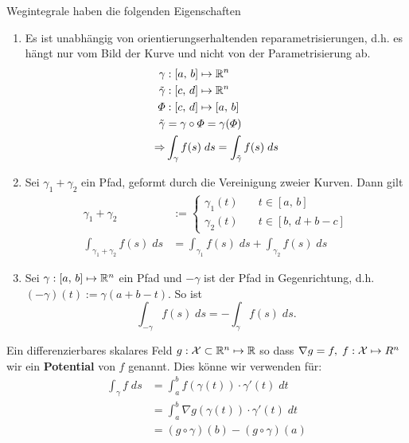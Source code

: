 Wegintegrale haben die folgenden Eigenschaften
\begin{enumerate}[label=(\arabic*)]
  \item Es ist unabhängig von orientierungserhaltenden reparametrisierungen, d.h. es hängt nur vom Bild der Kurve
  und nicht von der Parametrisierung ab.
  \begin{align*}
    \gamma&: [a,\, b] \mapsto \mathbb{R}^n\\
    \tilde{\gamma}&: [c,\, d] \mapsto \mathbb{R}^n\\
    \varPhi&: [c, \, d] \mapsto [a, \, b]\\
    \tilde{\gamma} &= \gamma \circ \varPhi = \gamma(\varPhi)\\
    \Rightarrow &\int_\gamma f(s) \; ds = \int_{\tilde{\gamma}} f(s) \; ds
  \end{align*}
  
  \item Sei $\gamma_1 + \gamma_2$ ein Pfad, geformt durch die Vereinigung zweier Kurven. Dann gilt
  \begin{align*}
    \gamma_1 + \gamma_2 &:=
    \begin{cases}
      \gamma_1(t) \quad& t \in [a, \, b]\\
      \gamma_2(t) \quad& t \in [b, \, d + b - c]
    \end{cases}\\
    \int_{\gamma_1 + \gamma_2} f(s) \; ds &= \int_{\gamma_1} f(s) \; ds + \int_{\gamma_2} f(s)\; ds
  \end{align*}
  
  \item Sei $\gamma: [a, \, b] \mapsto \mathbb{R}^n$ ein Pfad und $-\gamma$ ist der Pfad in Gegenrichtung, d.h.
  $(-\gamma)(t) := \gamma(a + b - t)$. So ist
  $$\int_{-\gamma} f(s) \; ds = - \int_\gamma f(s) \; ds.$$
\end{enumerate}



Ein differenzierbares skalares Feld $g: \mathcal{X} \subset \mathbb{R}^n \mapsto \mathbb{R}$ so dass
$\nabla g = f, \; f: \mathcal{X} \mapsto R^n$ wir ein \textbf{Potential} von $f$ genannt. Dies könne wir
verwenden für:
\begin{align*}
  \int_\gamma f \; ds &= \int_a^b f(\gamma(t)) \cdot \gamma'(t) \; dt\\
  &= \int_a^b \nabla g(\gamma(t)) \cdot \gamma'(t) \; dt\\
  &= (g \circ \gamma)(b) - (g \circ \gamma)(a)
\end{align*}

